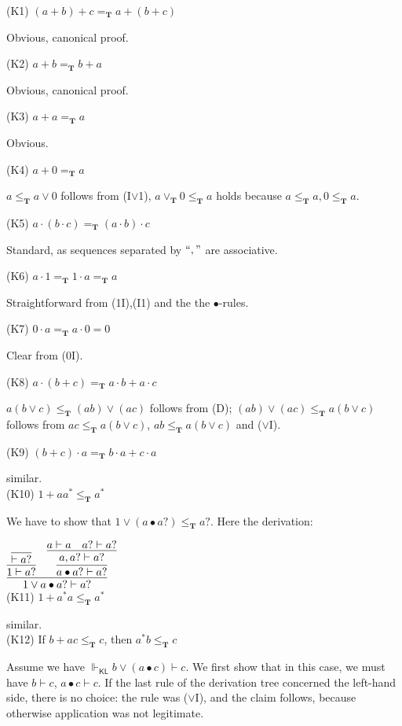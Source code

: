\documentclass{eptcs}
\newcommand{\KL}{\mathsf{KL}}
\begin{document}
(K1) $(a+b)+c=_{\textbf{T}}a+(b+c)$

Obvious, canonical proof.


(K2) $a+b=_{\textbf{T}}b+a$

Obvious, canonical proof.

(K3) $a+a=_{\textbf{T}}a$

Obvious.

(K4) $a+0=_{\textbf{T}}a$

$a\leq_\textbf{T} a\vee 0$ follows from (I$\vee$1),
$a\vee_\textbf{T} 0\leq_\textbf{T} a$ holds because 
$a\leq_\textbf{T} a,0\leq_\textbf{T} a$.

(K5) $a\cdot(b\cdot c)=_{\textbf{T}}(a\cdot b)\cdot c$

Standard, as sequences separated by $``,"$ are associative.

(K6) $a\cdot 1=_{\textbf{T}}1\cdot a=_{\textbf{T}}a$

Straightforward from (1I),(I1) and the the $\bullet$-rules.

(K7) $0\cdot a=_{\textbf{T}}a\cdot 0=0$

Clear from (0I).

(K8) $a\cdot(b+c)=_{\textbf{T}}a\cdot b+a\cdot c$

$a(b\vee c)\leq_\textbf{T}(a b)\vee (ac)$
follows from (D);
$(ab)\vee (ac)\leq_\textbf{T}a(b\vee c)$
follows from $a c\leq_\textbf{T}a(b\vee c)$,
$a b\leq_\textbf{T}a(b\vee c)$ and 
($\vee$I).

(K9) $(b+c)\cdot a=_{\textbf{T}}b\cdot a+c\cdot a$

similar.
\\

(K10) $1+aa^*\leq_{\textbf{T}} a^*$

We have to show that
$1\vee (a\bullet a?)\leq_\textbf{T} a?$. Here the derivation:


$\infer{1\vee a\bullet a?\vdash a?}
{\infer{1\vdash a?}
{\infer{\vdash a?}{}} &
\infer{a\bullet a?\vdash a?}{\infer{a,a?\vdash a? }{a\vdash a & a?\vdash a?}}}$
\\


(K11) $1+a^*a\leq_{\textbf{T}} a^*$

similar. 
\\

(K12) If $b+ac\leq_{\textbf{T}} c$, then $a^*b\leq_{\textbf{T}} c$

Assume we
have $\Vdash_{\KL}b\vee (a\bullet c)\vdash c$. 
We first show that in this case, 
we must have $b\vdash c$, $a\bullet c\vdash c$.
If the last rule of the derivation tree concerned the left-hand side, there is
no choice: the rule was ($\vee$I), and the claim follows,
because otherwise application was not legitimate.
\end{document}
